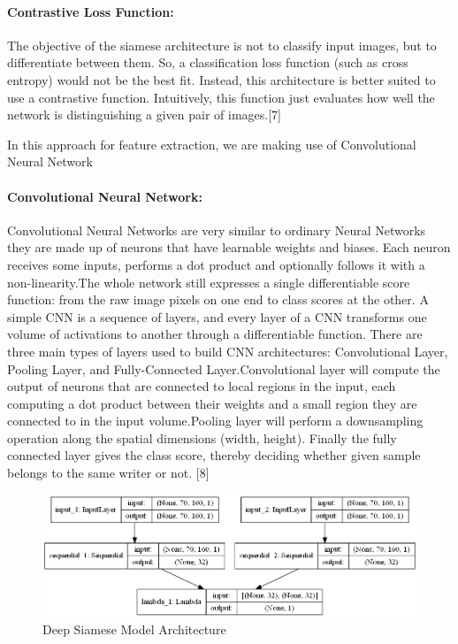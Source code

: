 \documentclass{article}
\begin{document}
\paragraph{Contrastive Loss Function:}
The objective of the siamese architecture is not to classify input images, but to differentiate between them. So, a classification loss function (such as cross entropy) would not be the best fit. Instead, this architecture is better suited to use a contrastive function. Intuitively, this function just evaluates how well the network is distinguishing a given pair of images.[7]

In this approach for feature extraction, we are making use of Convolutional Neural Network

\paragraph{Convolutional Neural Network:}
Convolutional Neural Networks are very similar to ordinary Neural Networks they are made up of neurons that have learnable weights and biases. Each neuron receives some inputs, performs a dot product and optionally follows it with a non-linearity.The whole network still expresses a single differentiable score function: from the raw image pixels on one end to class scores at the other. A simple CNN is a sequence of layers, and every layer of a CNN transforms one volume of activations to another through a differentiable function. There are  three main types of layers used to build CNN architectures: Convolutional Layer, Pooling Layer, and Fully-Connected Layer.Convolutional layer will compute the output of neurons that are connected to local regions in the input, each computing a dot product between their weights and a small region they are connected to in the input volume.Pooling layer will perform a downsampling operation along the spatial dimensions (width, height).
Finally the fully connected layer gives the class score, thereby deciding whether given sample belongs to the same writer or not. [8]

\begin{figure}[H]
  \centering
  \includegraphics[scale= 0.4]{siamese_dl.png}
  \caption{Deep Siamese Model Architecture}
  
\end{figure}
\end{document}
